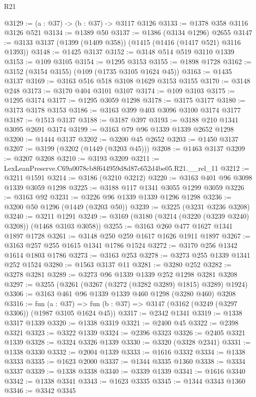 \begin{lexlean}{R21}
\begin{coremodule}
@3129 := (a : @37) -> (b : @37) -> @3117 @3126
@3133 := @1378 @358 @3116 @3126 @521
@3134 := @1389 @50
@3137 := @1386 (@3134 @1296) @2655
@3147 := @3133 @3137 (@1399 (@1409 @358)) (@1415 (@1416 (@1417 @521) @3116 @1393))
@3148 := @1425 @3137
@3152 := @3148 @514 @519 @3110 @1339
@3153 := @109 @3105
@3154 := @1295 @3153
@3155 := @1898 @1728
@3162 := @3152 (@3154 @3155) (@109 (@1735 @3105 @1624 @45))
@3163 := @1435 @3137
@3169 := @3163 @516 @518 @3108 @1629 @3153 @3155
@3170 := @3148 @248
@3173 := @3170 @404 @3101 @3107
@3174 := @109 @3103
@3175 := @1295 @3174
@3177 := @1295 @3059 @1298
@3178 := @3175 @3177
@3180 := @3173 @3178 @3153
@3186 := @3163 @399 @403 @3096 @3100 @3174 @3177
@3187 := @1513 @3137
@3188 := @3187 @397
@3193 := @3188 @210 @1341 @3095 @2691 @3174
@3199 := @3163 @79 @96 @1339 @1339 @2652 @1298
@3200 := @1444 @3137
@3202 := @3200 @45 @2652
@3203 := @1450 @3137
@3207 := @3199 (@3202 (@1449 (@3203 @45)))
@3208 := @1463 @3137
@3209 := @3207 @3208
@3210 := @3193 @3209
@3211 := LexLeanPreserve.C69a0078cb8f644959d8d87c652d4be05.R21.__rel_11
@3212 := @3211 @1591
@3214 := @3186 (@3210 @3212)
@3220 := @3163 @401 @96 @3098 @1339 @3059 @1298
@3225 := @3188 @117 @1341 @3055 @1299 @3059
@3226 := @3163 @92
@3231 := @3226 @96 @1339 @1339 @1296 @1298
@3236 := @3200 @50 @1296 (@1449 (@3203 @50))
@3239 := @3225 (@3231 @3236 @3208)
@3240 := @3211 @1291
@3249 := @3169 (@3180 (@3214 (@3220 (@3239 @3240) @3208)) (@1468 @3103 @3058))
@3255 := @3163 @260 @477 @1627 @1341 @1897 @1728
@3261 := @3148 @250 @259 @1617 @1626 @1911 @1897
@3267 := @3163 @257 @255 @1615 @1341 @1786 @1524
@3272 := @3170 @256 @1342 @1614 @1803 @1786
@3273 := @3163 @253
@3278 := @3273 @255 @1339 @1341 @252 @1524
@3280 := @1563 @3137 @11
@3281 := @3280 @252
@3282 := @3278 @3281
@3289 := @3273 @96 @1339 @1339 @252 @1298 @3281 @3208
@3297 := @3255 (@3261 (@3267 (@3272 (@3282 @3289) @1815) @3289) @1924)
@3306 := @3163 @461 @96 @1339 @1339 @460 @1298 (@3280 @460) @3208
@3316 := fun (a : @37) =>
  fun (b : @37) => @3147 (@3162 (@3249 (@3297 @3306)) (@1987 @3105 @1624 @45))
@3317 := @2342 @1341
@3319 := @1338 @3317 @1339
@3320 := @1338 @3319
@3321 := @2400 @45
@3322 := @2398 @3321
@3323 := @3322 @1339
@3324 := @2396 @3323
@3326 := @2405 @3321 @1339
@3328 := @3324 @3326 @1339
@3330 := @3320 (@3328 @2341)
@3331 := @1338 @3330
@3332 := @2004 @1339
@3333 := @1616 @3332
@3334 := @1338 @3333
@3335 := @1623 @2000
@3337 := @1344 @3335 @1360
@3338 := @3334 @3337
@3339 := @1338 @3338
@3340 := @3339 @1339
@3341 := @1616 @3340
@3342 := @1338 @3341
@3343 := @1623 @3335
@3345 := @1344 @3343 @1360
@3346 := @3342 @3345

\end{coremodule}
\end{lexlean}
